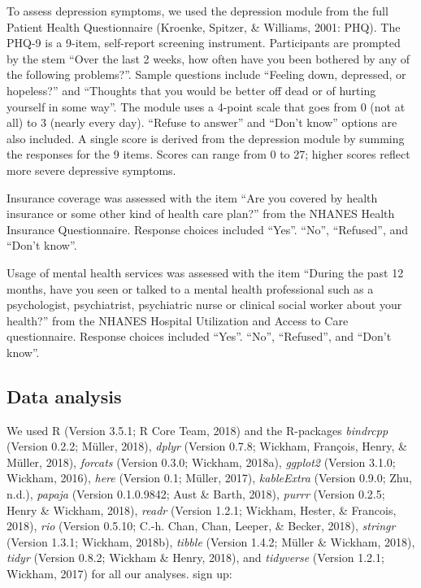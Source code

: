 \documentclass[man]{apa6}
\begin{document}
To assess depression symptoms, we used the depression module from the
full Patient Health Questionnaire (Kroenke, Spitzer, \& Williams, 2001:
PHQ). The PHQ-9 is a 9-item, self-report screening instrument.
Participants are prompted by the stem \enquote{Over the last 2 weeks,
how often have you been bothered by any of the following problems?}.
Sample questions include \enquote{Feeling down, depressed, or hopeless?}
and \enquote{Thoughts that you would be better off dead or of hurting
yourself in some way}. The module uses a 4-point scale that goes from 0
(not at all) to 3 (nearly every day). \enquote{Refuse to answer} and
\enquote{Don't know} options are also included. A single score is
derived from the depression module by summing the responses for the 9
items. Scores can range from 0 to 27; higher scores reflect more severe
depressive symptoms.

Insurance coverage was assessed with the item \enquote{Are you covered
by health insurance or some other kind of health care plan?} from the
NHANES Health Insurance Questionnaire. Response choices included
\enquote{Yes}. \enquote{No}, \enquote{Refused}, and \enquote{Don't
know}.

Usage of mental health services was assessed with the item
\enquote{During the past 12 months, have you seen or talked to a mental
health professional such as a psychologist, psychiatrist, psychiatric
nurse or clinical social worker about your health?} from the NHANES
Hospital Utilization and Access to Care questionnaire. Response choices
included \enquote{Yes}. \enquote{No}, \enquote{Refused}, and
\enquote{Don't know}.

\subsection{Data analysis}\label{data-analysis}

We used R (Version 3.5.1; R Core Team, 2018) and the R-packages
\emph{bindrcpp} (Version 0.2.2; Müller, 2018), \emph{dplyr} (Version
0.7.8; Wickham, François, Henry, \& Müller, 2018), \emph{forcats}
(Version 0.3.0; Wickham, 2018a), \emph{ggplot2} (Version 3.1.0; Wickham,
2016), \emph{here} (Version 0.1; Müller, 2017), \emph{kableExtra}
(Version 0.9.0; Zhu, n.d.), \emph{papaja} (Version 0.1.0.9842; Aust \&
Barth, 2018), \emph{purrr} (Version 0.2.5; Henry \& Wickham, 2018),
\emph{readr} (Version 1.2.1; Wickham, Hester, \& Francois, 2018),
\emph{rio} (Version 0.5.10; C.-h. Chan, Chan, Leeper, \& Becker, 2018),
\emph{stringr} (Version 1.3.1; Wickham, 2018b), \emph{tibble} (Version
1.4.2; Müller \& Wickham, 2018), \emph{tidyr} (Version 0.8.2; Wickham \&
Henry, 2018), and \emph{tidyverse} (Version 1.2.1; Wickham, 2017) for
all our analyses. sign up:
\end{document}

